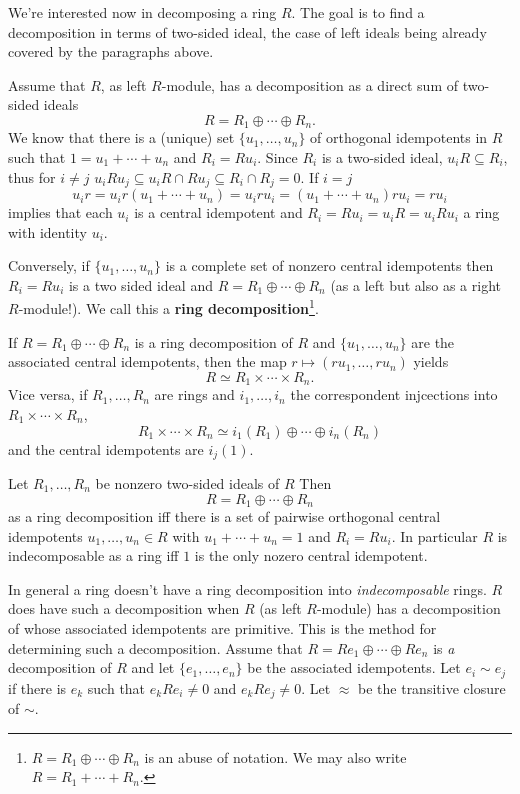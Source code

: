 We're interested now in decomposing a ring $R$. 
The goal is to find a decomposition in terms of two-sided ideal, the case of left ideals being already covered by the paragraphs above. 

Assume that $R$, as left $R$-module, has a decomposition as a direct sum of two-sided ideals 
$$R=R_1 \oplus \cdots \oplus R_n\text{.}$$
We know that there is a (unique) set $\{u_1, \ldots, u_n\}$ of orthogonal idempotents in $R$ such that $1=u_1 + \cdots + u_n$ and $R_i=Ru_i$. 
Since $R_i$ is a two-sided ideal, $u_iR \subseteq R_i$, thus for $i\neq j$ $u_i R u_j \subseteq u_i R \cap Ru_j \subseteq R_i \cap R_j=0$. 
If $i =j$ 
$$u_i r = u_i r (u_1 + \cdots + u_n) = u_i r u_i =(u_1 + \cdots + u_n)r u_i = r u_i$$
implies that each $u_i$ is a central idempotent and $R_i = Ru_i =u_i R = u_i R u_i$ a ring with identity $u_i$. 

Conversely, if $\{u_1, \ldots, u_n\}$ is a complete set of nonzero central idempotents then $R_i=Ru_i$ is a two sided ideal and $R=R_1 \oplus \cdots \oplus R_n$ (as a left but also as a right $R$-module!).
We call this a \textbf{ring decomposition}\footnote{$R=R_1 \oplus \cdots \oplus R_n$ is an abuse of notation. 
We may also write $R=R_1 + \cdots + R_n$.}. 

If $R=R_1 \oplus \cdots \oplus R_n$ is a ring decomposition of $R$ and $\{u_1, \ldots, u_n\}$ are the associated central idempotents, then the map $r \mapsto (ru_1, \ldots, ru_n)$ yields
$$R \simeq R_1 \times \cdots \times R_n\text{.}$$ 
Vice versa, if $R_1, \ldots, R_n$ are rings and $i_1, \ldots, i_n$ the correspondent injcections into $R_1 \times \cdots \times R_n$, 
$$R_1 \times \cdots \times R_n \simeq i_1(R_1) \oplus \cdots \oplus i_n(R_n)$$
and the central idempotents are $i_j(1)$. 

\begin{thm}
Let $R_1, \ldots, R_n$ be nonzero two-sided ideals of $R$ Then 
$$R = R_1 \oplus \cdots \oplus R_n$$ 
as a ring decomposition iff there is a set of pairwise orthogonal central idempotents $u_1, \ldots, u_n \in R$ with $u_1 + \cdots + u_n =1$ and $R_i =Ru_i$. 
In particular $R$ is indecomposable as a ring iff $1$ is the only nozero central idempotent.
\end{thm}

In general a ring doesn't have a ring decomposition into \textit{indecomposable} rings. 
$R$ does have such a decomposition when $R$ (as left $R$-module) has a decomposition of whose associated idempotents are primitive. 
This is the method for determining such a decomposition.
Assume that $R=Re_1 \oplus \cdots \oplus Re_n$ is \textit{a} decomposition of $R$ and let $\{e_1, \ldots, e_n\}$ be the associated idempotents. 
Let $e_i \sim e_j$ if there is $e_k$ such that $e_k R e_i \neq 0$ and $e_k R e_j \neq 0$. 
Let $\approx$ be the transitive closure of $\sim$. 

